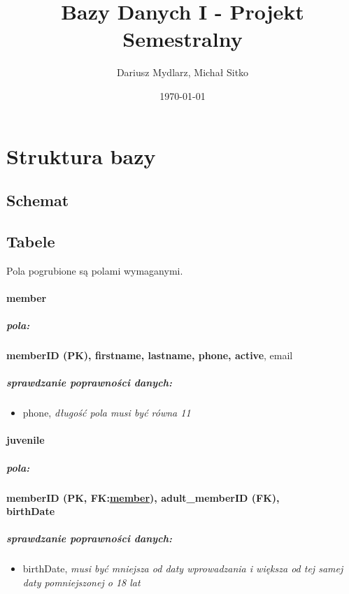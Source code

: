 \documentclass[12pt,a4paper,titlepage]{article}
\title{Bazy Danych I - Projekt Semestralny}
\author{Dariusz Mydlarz, Michał Sitko}
\date{\today}
\begin{document}
\maketitle
\newpage


\section{Struktura bazy}
\subsection{Schemat}
\begin{center}
	\label{fig:schemat}
\end{center}


\subsection{Tabele}
Pola pogrubione są polami wymaganymi.
\paragraph{member}
\subparagraph{pola:}
\textbf{memberID (PK), firstname, lastname, phone, active}, email
\subparagraph{sprawdzanie poprawności danych:}
\begin{itemize}
	\item phone, \textit{długość pola musi być równa 11}
\end{itemize}

\newpage

\paragraph{juvenile}
\subparagraph{pola:}
\textbf{memberID (PK, FK:\underline{member}), adult\_memberID (FK),} \\ \textbf{birthDate}
\subparagraph{sprawdzanie poprawności danych:}
\begin{itemize}
	\item birthDate, \textit{musi być mniejsza od daty wprowadzania i większa od tej samej daty pomniejszonej o 18 lat }
\end{itemize}

\end{document}
